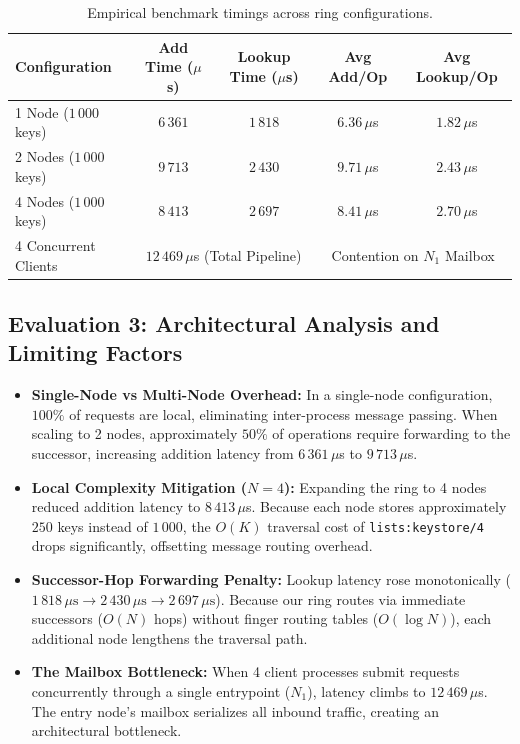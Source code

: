 \documentclass[a4paper, 11pt]{article}
\begin{document}
\begin{table}[h]
\centering
\small
\begin{tabular}{@{}lcccc@{}}
\toprule
\textbf{Configuration} & \textbf{Add Time ($\mu$s)} & \textbf{Lookup Time ($\mu$s)} & \textbf{Avg Add/Op} & \textbf{Avg Lookup/Op} \\ \midrule
1 Node ($1\,000$ keys)  & $6\,361$  & $1\,818$ & $6.36\,\mu$s & $1.82\,\mu$s \\
2 Nodes ($1\,000$ keys) & $9\,713$  & $2\,430$ & $9.71\,\mu$s & $2.43\,\mu$s \\
4 Nodes ($1\,000$ keys) & $8\,413$  & $2\,697$ & $8.41\,\mu$s & $2.70\,\mu$s \\
4 Concurrent Clients    & \multicolumn{2}{c}{$12\,469\,\mu$s (Total Pipeline)} & \multicolumn{2}{c}{Contention on $N_1$ Mailbox} \\ \bottomrule
\end{tabular}
\caption{Empirical benchmark timings across ring configurations.}
\end{table}

\subsection{Evaluation 3: Architectural Analysis and Limiting Factors}
\begin{itemize}
    \item \textbf{Single-Node vs Multi-Node Overhead:} In a single-node configuration, $100\%$ of requests are local, eliminating inter-process message passing. When scaling to 2 nodes, approximately $50\%$ of operations require forwarding to the successor, increasing addition latency from $6\,361\,\mu$s to $9\,713\,\mu$s.
    \item \textbf{Local Complexity Mitigation ($N=4$):} Expanding the ring to 4 nodes reduced addition latency to $8\,413\,\mu$s. Because each node stores approximately $250$ keys instead of $1\,000$, the $O(K)$ traversal cost of \texttt{lists:keystore/4} drops significantly, offsetting message routing overhead.
    \item \textbf{Successor-Hop Forwarding Penalty:} Lookup latency rose monotonically ($1\,818\,\mu\text{s} \rightarrow 2\,430\,\mu\text{s} \rightarrow 2\,697\,\mu\text{s}$). Because our ring routes via immediate successors ($O(N)$ hops) without finger routing tables ($O(\log N)$), each additional node lengthens the traversal path.
    \item \textbf{The Mailbox Bottleneck:} When 4 client processes submit requests concurrently through a single entrypoint ($N_1$), latency climbs to $12\,469\,\mu$s. The entry node's mailbox serializes all inbound traffic, creating an architectural bottleneck.
\end{itemize}
\end{document}

